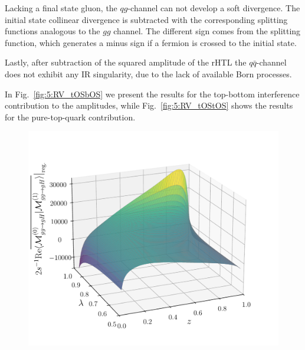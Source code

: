 Lacking a final state gluon, the $q g$-channel can not develop a soft divergence. The initial state collinear divergence is subtracted with the corresponding splitting functions analogous to the $gg$ channel. The different sign comes from the splitting function, which generates a minus sign if a fermion is crossed to the initial state.

Lastly, after subtraction of the squared amplitude of the \acs{rHTL} the $q \bar{q}$-channel does not exhibit any \acs{IR} singularity, due to the lack of available Born processes.

In Fig.~\ref{fig:5:RV_tOSbOS} we present the results for the top-bottom interference contribution to the amplitudes, while Fig.~\ref{fig:5:RV_tOStOS} shows the results for the pure-top-quark contribution.
\begin{figure}[h]
  \begin{minipage}[t]{0.49\textwidth}
  \centering
  \includegraphics[width=\textwidth]{Images/RV_amplitudes/tOSbOS_gg.pdf}
  \end{minipage}
  \begin{minipage}[t]{0.49\textwidth}
  \centering

\end{minipage}
\end{figure}
